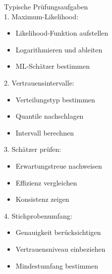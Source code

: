 \begin{KR}{Typische Prüfungsaufgaben}\\
1. Maximum-Likelihood:
   \begin{itemize}
     \item Likelihood-Funktion aufstellen
     \item Logarithmieren und ableiten
     \item ML-Schätzer bestimmen
   \end{itemize}

2. Vertrauensintervalle:
   \begin{itemize}
     \item Verteilungstyp bestimmen
     \item Quantile nachschlagen
     \item Intervall berechnen
   \end{itemize}

3. Schätzer prüfen:
   \begin{itemize}
     \item Erwartungstreue nachweisen
     \item Effizienz vergleichen
     \item Konsistenz zeigen
   \end{itemize}

4. Stichprobenumfang:
   \begin{itemize}
     \item Genauigkeit berücksichtigen
     \item Vertrauensniveau einbeziehen
     \item Mindestumfang bestimmen
   \end{itemize}
\end{KR}